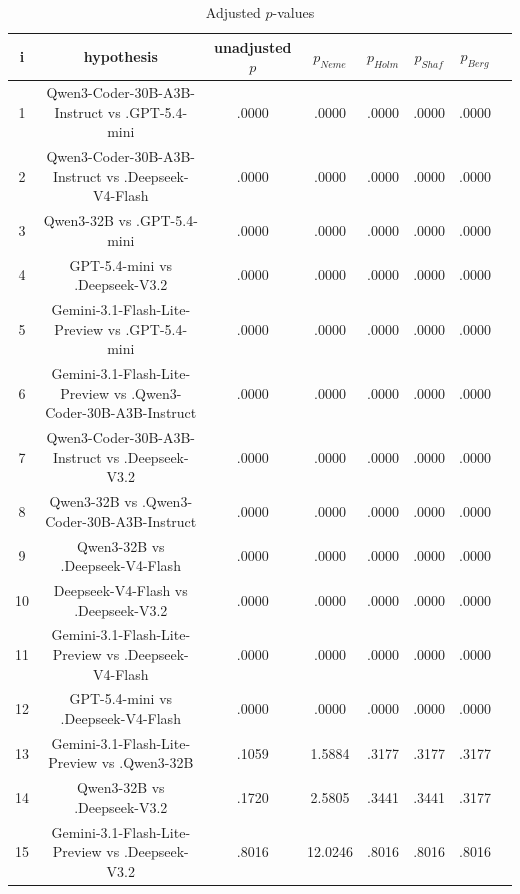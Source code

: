 \documentclass[a4paper,10pt]{article}
\begin{document}
\begin{landscape}
\begin{table}[!htp]
\centering\tiny
\caption{Adjusted $p$-values}
\begin{tabular}{cccccccc}
i&hypothesis&unadjusted $p$&$p_{Neme}$&$p_{Holm}$&$p_{Shaf}$&$p_{Berg}$\\
\hline
1&Qwen3-Coder-30B-A3B-Instruct vs .GPT-5.4-mini&.0000&.0000&.0000&.0000&.0000\\2&Qwen3-Coder-30B-A3B-Instruct vs .Deepseek-V4-Flash&.0000&.0000&.0000&.0000&.0000\\3&Qwen3-32B vs .GPT-5.4-mini&.0000&.0000&.0000&.0000&.0000\\4&GPT-5.4-mini vs .Deepseek-V3.2&.0000&.0000&.0000&.0000&.0000\\5&Gemini-3.1-Flash-Lite-Preview vs .GPT-5.4-mini&.0000&.0000&.0000&.0000&.0000\\6&Gemini-3.1-Flash-Lite-Preview vs .Qwen3-Coder-30B-A3B-Instruct&.0000&.0000&.0000&.0000&.0000\\7&Qwen3-Coder-30B-A3B-Instruct vs .Deepseek-V3.2&.0000&.0000&.0000&.0000&.0000\\8&Qwen3-32B vs .Qwen3-Coder-30B-A3B-Instruct&.0000&.0000&.0000&.0000&.0000\\9&Qwen3-32B vs .Deepseek-V4-Flash&.0000&.0000&.0000&.0000&.0000\\10&Deepseek-V4-Flash vs .Deepseek-V3.2&.0000&.0000&.0000&.0000&.0000\\11&Gemini-3.1-Flash-Lite-Preview vs .Deepseek-V4-Flash&.0000&.0000&.0000&.0000&.0000\\12&GPT-5.4-mini vs .Deepseek-V4-Flash&.0000&.0000&.0000&.0000&.0000\\13&Gemini-3.1-Flash-Lite-Preview vs .Qwen3-32B&.1059&1.5884&.3177&.3177&.3177\\14&Qwen3-32B vs .Deepseek-V3.2&.1720&2.5805&.3441&.3441&.3177\\15&Gemini-3.1-Flash-Lite-Preview vs .Deepseek-V3.2&.8016&12.0246&.8016&.8016&.8016\\\hline
\end{tabular}
\end{table}

\end{landscape}
\end{document}
